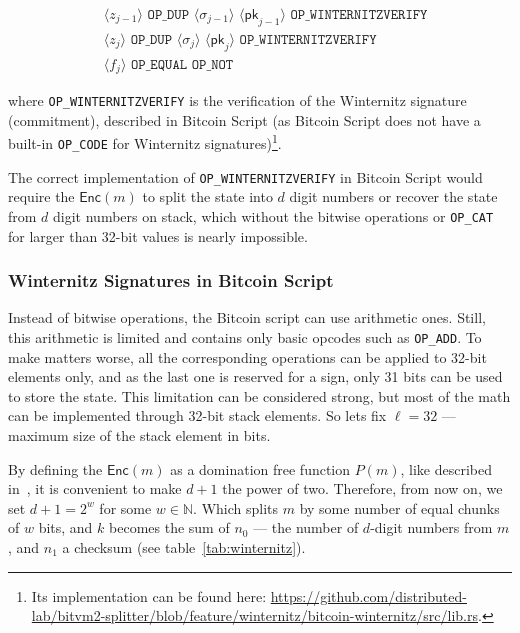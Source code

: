 \documentclass{iacrtrans}
\newcommand{\elem}[1]{\, \langle #1 \rangle \,}
\newcommand{\opcode}[1]{\, \texttt{#1} \,}
\begin{document}
\begin{empheqboxed}
  \begin{align*}
    &\elem{z_{j-1}} \opcode{OP\_DUP} \elem{\sigma_{j-1}}
    \elem{\mathsf{pk}_{j-1}} \opcode{OP\_WINTERNITZVERIFY} \\
    &\elem{z_{j}} \opcode{OP\_DUP} \elem{\sigma_{j}}
    \elem{\mathsf{pk}_{j}} \opcode{OP\_WINTERNITZVERIFY} \\
    &\elem{f_j} \opcode{OP\_EQUAL} \opcode{OP\_NOT}
  \end{align*}
\end{empheqboxed}

where \texttt{OP\_WINTERNITZVERIFY} is the verification of the
Winternitz signature (commitment), described in Bitcoin Script (as
  Bitcoin Script does not have a built-in \texttt{OP\_CODE} for
Winternitz signatures)\footnote{Its implementation can be found here:
\url{https://github.com/distributed-lab/bitvm2-splitter/blob/feature/winternitz/bitcoin-winternitz/src/lib.rs}.}.

The correct implementation of \texttt{OP\_WINTERNITZVERIFY} in Bitcoin
Script would require the $\mathsf{Enc}(m)$ to split the state into $d$
digit numbers or recover the state from $d$ digit numbers on stack,
which without the bitwise operations or \texttt{OP\_CAT} for larger
than 32-bit values is nearly impossible.

\subsubsection{Winternitz Signatures in Bitcoin
  Script}\label{sec:winternitz-in-bitcoin-script}

Instead of bitwise operations, the Bitcoin script can use arithmetic
ones. Still, this arithmetic is limited and contains only basic
opcodes such as \texttt{OP\_ADD}. To make matters worse, all the
corresponding operations can be applied to 32-bit elements only, and
as the last one is reserved for a sign, only 31 bits can be used to
store the state. This limitation can be considered strong, but most of
the math can be implemented through 32-bit stack elements. So lets fix
$\ell = 32$ --- maximum size of the stack element in bits.

By defining the $\mathsf{Enc}(m)$ as a domination free function
$P(m)$, like described in~\cite{applied-crypto}, it is convenient to
make $d+1$ the power of two. Therefore, from now on, we set
$d+1 = 2^w$ for some $w \in \mathbb{N}$. Which splits $m$ by some number of equal
chunks of $w$ bits, and $k$ becomes the sum of $n_0$ --- the number of
$d$-digit numbers from $m$, and $n_1$ a checksum (see
table~\ref{tab:winternitz}).
\end{document}
